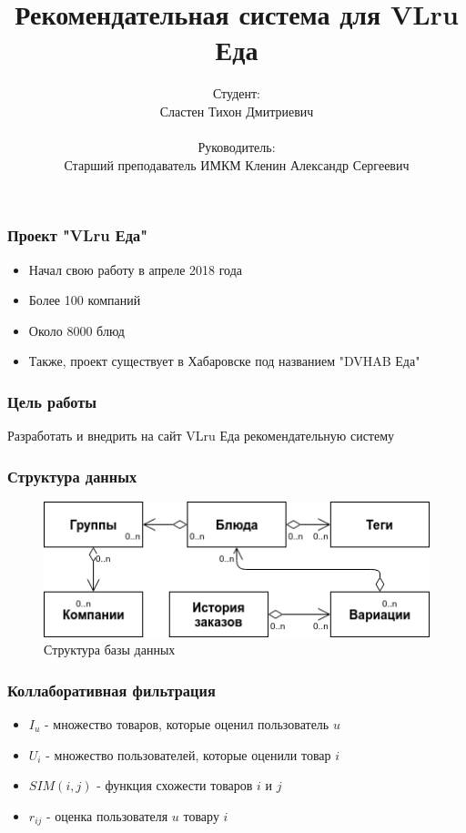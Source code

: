 \documentclass[10pt, unicode]{beamer}
\title{Рекомендательная система для VLru Еда}
\author{
    Студент: \\ Сластен Тихон Дмитриевич \\ \\
    Руководитель: \\ Старший преподаватель ИМКМ Кленин Александр Сергеевич}
\institute{Б8403а Прикладная математика и информатика}
\date{}
\begin{document}
\maketitle

\begin{frame}
  \frametitle{Проект "VLru Еда"}
  \begin{itemize}
    \item Начал свою работу в апреле 2018 года
    \item Более 100 компаний
    \item Около 8000 блюд
    \item Также, проект существует в Хабаровске под названием "DVHAB Еда"
  \end{itemize}
\end{frame}

\begin{frame}
  \frametitle{Цель работы}
  Разработать и внедрить на сайт VLru Еда рекомендательную систему
\end{frame}

\begin{frame}
  \frametitle{Структура данных}
  \begin{figure}[H]
    \centering
    \includegraphics[scale=0.6]{images/database.png}
    \caption{Структура базы данных}
  \end{figure}
\end{frame}

\begin{frame}
  \frametitle{Коллаборативная фильтрация}
  \begin{itemize}
    \item $I_u$ - множество товаров, которые оценил пользователь $u$
    \item $U_i$ - множество пользователей, которые оценили товар $i$
    \item $SIM(i,j)$ - функция схожести товаров $i$ и $j$
    \item $r_{ij}$ - оценка пользователя $u$ товару $i$
  \end{itemize}
\end{frame}
\end{document}
